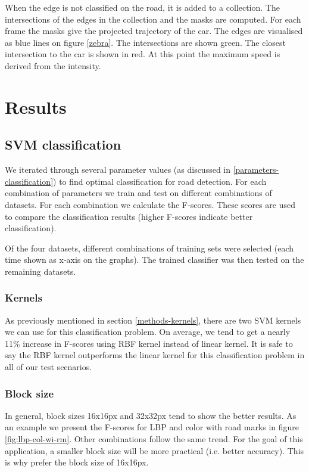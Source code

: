 \documentclass[runningheads,a4paper]{llncs}
\begin{document}
When the edge is not classified on the road, it is added to a collection. The intersections of the edges in the collection and the masks are computed. For each frame the masks give the projected trajectory of the car. 
The edges are visualised as blue lines on figure \ref{zebra}. The intersections are shown green. The closest intersection to the car is shown in red. At this point the maximum speed is derived from the intensity. 

\section{Results}

\subsection{SVM classification}\label{results-svm-classification}
We iterated through several parameter values (as discussed in \ref{parameters-classification}) to find optimal classification for road detection. For each combination of parameters we train and test on different combinations of datasets. For each combination we calculate the F-scores. These scores are used to compare the classification results (higher F-scores indicate better classification). 

Of the four datasets, different combinations of training sets were selected (each time shown as x-axis on the graphs). The trained classifier was then tested on the remaining datasets.

\subsubsection{Kernels}
As previously mentioned in section \ref{methods-kernels}, there are two SVM kernels we can use for this classification problem. On average, we tend to get a nearly 11\% increase in F-scores using RBF kernel instead of linear kernel. It is safe to say the RBF kernel outperforms the linear kernel for this classification problem in all of our test scenarios. 

\subsubsection{Block size}
In general, block sizes 16x16px and 32x32px tend to show the better results. As an example we present the F-scores for LBP and color with road marks in figure \ref{fig:lbp-col-wi-rm}. Other combinations follow the same trend. For the goal of this application, a smaller block size will be more practical (i.e. better accuracy). This is why prefer the block size of 16x16px. 
\end{document}

